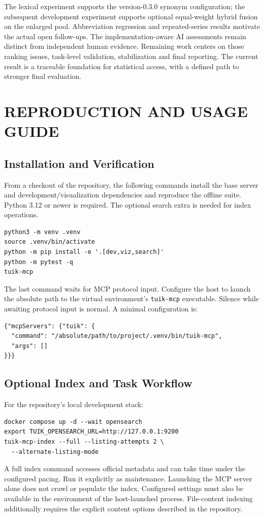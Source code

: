 \documentclass[a4paper,12pt]{report}
\newcommand{\code}[1]{\texttt{\small #1}}
\newenvironment{singlespace}{\begingroup\renewcommand{\baselinestretch}{1}\selectfont}{\par\endgroup}
\begin{document}
The lexical experiment supports the version-0.3.0 synonym configuration; the subsequent development experiment supports optional equal-weight hybrid fusion on the enlarged pool. Abbreviation regression and repeated-series results motivate the actual open follow-ups. The implementation-aware AI assessments remain distinct from independent human evidence. Remaining work centers on those ranking issues, task-level validation, stabilization and final reporting. The current result is a traceable foundation for statistical access, with a defined path to stronger final evaluation.




\appendix
\chapter{REPRODUCTION AND USAGE GUIDE}\label{app:reproduce}
\section{Installation and Verification}
From a checkout of the repository, the following commands install the base server and development/visualization dependencies and reproduce the offline suite. Python 3.12 or newer is required. The optional search extra is needed for index operations.
\begin{singlespace}
\begin{verbatim}
python3 -m venv .venv
source .venv/bin/activate
python -m pip install -e '.[dev,viz,search]'
python -m pytest -q
tuik-mcp
\end{verbatim}
\end{singlespace}
The last command waits for MCP protocol input. Configure the host to launch the absolute path to the virtual environment's \code{tuik-mcp} executable. Silence while awaiting protocol input is normal. A minimal configuration is:
\begin{singlespace}
\begin{verbatim}
{"mcpServers": {"tuik": {
  "command": "/absolute/path/to/project/.venv/bin/tuik-mcp",
  "args": []
}}}
\end{verbatim}
\end{singlespace}
\section{Optional Index and Task Workflow}
For the repository's local development stack:
\begin{singlespace}
\begin{verbatim}
docker compose up -d --wait opensearch
export TUIK_OPENSEARCH_URL=http://127.0.0.1:9200
tuik-mcp-index --full --listing-attempts 2 \
  --alternate-listing-mode
\end{verbatim}
\end{singlespace}
A full index command accesses official metadata and can take time under the configured pacing. Run it explicitly as maintenance. Launching the MCP server alone does not crawl or populate the index. Configured settings must also be available in the environment of the host-launched process. File-content indexing additionally requires the explicit content options described in the repository.
\end{document}
